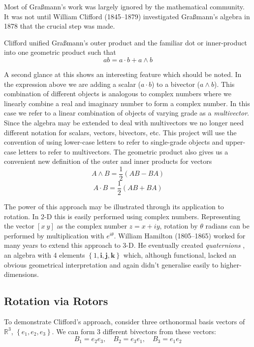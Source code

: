 Most of Gra{\ss}mann's work was largely ignored by the mathematical community.
It was not until William Clifford (1845--1879) investigated Gra{\ss}mann's
algebra in 1878 \cite{GA:clifford} that the crucial step was made.

Clifford unified Gra{\ss}mann's outer product and the familiar dot
or inner-product into one geometric product such that
\begin{displaymath}
ab = a\cdot b + a \wedge b
\end{displaymath}

A second glance at this shows an interesting feature which should be noted.
In the expression above we are adding a scalar ($a \cdot b$) to a 
bivector ($a \wedge b$). This combination of different objects is
analogous to complex numbers where we linearly combine
a real and imaginary number to form a complex number. In this case we
refer to a linear combination of objects of varying grade as a
\emph{multivector}. Since the algebra may be extended to deal with
multivectors we no longer need different notation for scalars, vectors,
bivectors, etc. This project will use the convention of using lower-case
letters to refer to single-grade objects and upper-case letters to refer
to multivectors. The geometric product also gives us a convenient new
definition of the outer and inner products for vectors
\[
A \wedge B = \frac{1}{2}(AB - BA)
\]
\[
A \cdot B = \frac{1}{2}(AB + BA)
\]

The power of this approach may be illustrated through its application
to rotation. In 2-D this is easily performed using complex numbers. Representing
the vector $[x\ y]$ as the complex number $z = x + iy$, rotation by
$\theta$ radians can be performed by multiplication with $e^{i\theta}$.
William Hamilton (1805--1865) worked for many years to extend this approach
to 3-D. He eventually created \emph{quaternions} \cite{hamilton2,hamilton1},
an algebra with 4 
elements $\left\{1, \mathbf{i}, \mathbf{j}, \mathbf{k}\right\}$ which, although
functional, lacked an obvious geometrical interpretation and again didn't
generalise easily to higher-dimensions.

\subsection{Rotation via Rotors}

To demonstrate Clifford's approach, consider three orthonormal basis
vectors of $\mathbb{R}^3$, $\left\{e_1, e_2, e_3\right\}$. We can form
3 different bivectors from these vectors:
\begin{displaymath}
B_1 = e_2e_3,\quad B_2 = e_3e_1,\quad B_3 = e_1e_2
\end{displaymath}

